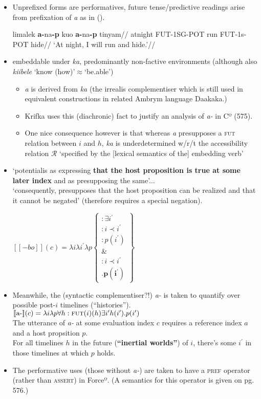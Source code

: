 \documentclass[10pt]{article}
\newcommand{\denote}[1]{\mbox{$[\![\mbox{#1}]\!]$}}
\newcommand{\mcom}[1]
{\marginpar{\color{black}\raggedleft\raggedright\hspace{0pt}\linespread{0.9}\footnotesize{#1}}}
\begin{document}
\begin{itemize}
	\item Unprefixed forms are performatives, future tense/predictive readings arise from prefixation of \textit{a} as in (\nextx).
	
	\pex\begingl\gla li\textdblhyphen malek \textbf{a-}na\textbf{-p} kuo \textbf{a-}na\textbf{-p} tinyam//
	\glb at\textdblhyphen night FUT-1SG-POT run FUT-1s-POT hide//
\glft	‘At night, I will run and hide.’//\endgl\xe


\item embeddable under \textit{ka}, predominantly non-factive environments (although also \textit{kiibele} `know (how)'$\approx$`be.able')
\begin{itemize}
	\item \textit{a} is derived from \textit{ka} (the irrealis complementiser which is still used in equivalent constructions in related Ambrym language Daakaka.) 
	\item \mcom{\textbf{(!!)} this seems dodgy as shit.} Krifka uses this (diachronic) fact to justify an analysis of \textit{a-} in Cº (575). 
	\item One nice consequence however is that whereas \textit{a} presupposes a \textsc{fut} relation between $i$ and $h$, \textit{ka} is underdetermined w/r/t the accessibility relation $\mathcal R$ `specified by the [lexical semantics of the] embedding verb'
\end{itemize}
\item `potentialis as expressing \textbf{that the host proposition is true at some later index} and as presupposing the same'...\\
`consequently, presupposes that the host proposition can be realized and that it cannot be negated' (therefore requires a special negation).

\pex 

$\denote{$-bo$}(c)=\lambda i\lambda i^\prime\lambda p
\begin{Bmatrix}
	:\exists i^\prime\\
	:i\prec i^\prime\\
	:p(i^\prime)\\
	\&\\
	:i\prec i^\prime\\
	.\boldsymbol{p(i^\prime)}
\end{Bmatrix}$	\xe
\item Meanwhile, the (syntactic complementiser?!) \textit{a-} is taken to quantify over possible post-$i$ timelines (``histories'').
\pex $\denote{a-}(c)=\lambda i\lambda p\forall h:\textsc{fut}(i)(h) \exists i^\prime h(i^\prime). p(i^\prime)$\\The utterance of \textit{a-} at some evaluation index $c$ requires a reference index $a$ and a host propsition $p$.\\
For all timelines $h$ in the future (\textbf{``inertial worlds''}) of $i$, there's some $i^\prime$   in those timelines at which $p$ holds. \xe
\item The performative uses (those without \textit{a-}) are taken to have a \textsc{pref} operator (rather than \textsc{assert}) in Forceº. (A semantics for this operator is given on pg. 576.)


\end{itemize}
\end{document}
